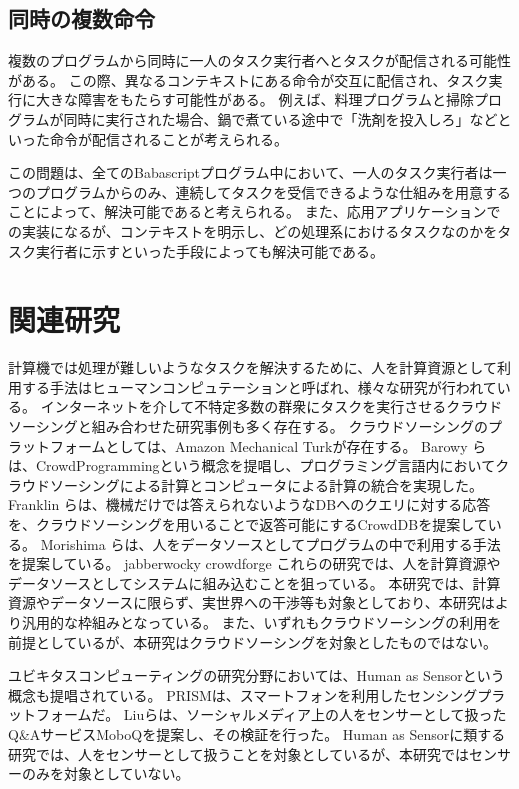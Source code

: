 \subsection{同時の複数命令}\label{ux540cux6642ux306eux8907ux6570ux547dux4ee4}

複数のプログラムから同時に一人のタスク実行者へとタスクが配信される可能性がある。
この際、異なるコンテキストにある命令が交互に配信され、タスク実行に大きな障害をもたらす可能性がある。
例えば、料理プログラムと掃除プログラムが同時に実行された場合、鍋で煮ている途中で「洗剤を投入しろ」などといった命令が配信されることが考えられる。

この問題は、全てのBabascriptプログラム中において、一人のタスク実行者は一つのプログラムからのみ、連続してタスクを受信できるような仕組みを用意することによって、解決可能であると考えられる。
また、応用アプリケーションでの実装になるが、コンテキストを明示し、どの処理系におけるタスクなのかをタスク実行者に示すといった手段によっても解決可能である。

\section{関連研究}\label{ux95a2ux9023ux7814ux7a76}

計算機では処理が難しいようなタスクを解決するために、人を計算資源として利用する手法はヒューマンコンピュテーション\cite{HumanComputation}と呼ばれ、様々な研究が行われている。
インターネットを介して不特定多数の群衆にタスクを実行させるクラウドソーシングと組み合わせた研究事例も多く存在する。
クラウドソーシングのプラットフォームとしては、Amazon Mechanical
Turk\cite{mechanicalturk}が存在する。 Barowy
らは、CrowdProgrammingという概念を提唱し、プログラミング言語内においてクラウドソーシングによる計算とコンピュータによる計算の統合を実現した\cite{automan}。
Franklin
らは、機械だけでは答えられないようなDBへのクエリに対する応答を、クラウドソーシングを用いることで返答可能にするCrowdDBを提案している\cite{crowddb}。
Morishima
らは、人をデータソースとしてプログラムの中で利用する手法を提案している\cite{cylog}。
jabberwocky crowdforge
これらの研究では、人を計算資源やデータソースとしてシステムに組み込むことを狙っている。
本研究では、計算資源やデータソースに限らず、実世界への干渉等も対象としており、本研究はより汎用的な枠組みとなっている。
また、いずれもクラウドソーシングの利用を前提としているが、本研究はクラウドソーシングを対象としたものではない。

ユビキタスコンピューティングの研究分野においては、Human as
Sensorという概念も提唱されている。
PRISMは、スマートフォンを利用したセンシングプラットフォームだ\cite{prism}。
Liuらは、ソーシャルメディア上の人をセンサーとして扱ったQ\&AサービスMoboQを提案し、その検証を行った。
Human as
Sensorに類する研究では、人をセンサーとして扱うことを対象としているが、本研究ではセンサーのみを対象としていない。

